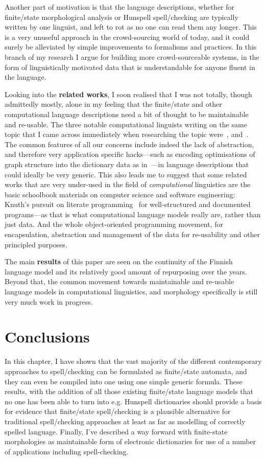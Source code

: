 \documentclass[officiallayout]{unihelcompling}
\begin{document}
Another part of motivation is that the language descriptions, whether for
finite\-/state morphological analysis or Hunspell spell\-/checking are typically
written by one linguist, and left to rot as no one can read them any longer.
This is a very unuseful approach in the crowd-sourcing world of today, and it
could surely be alleviated by simple improvements to formalisms and practices.
In this branch of my research I argue for building more crowd-sourceable
systems, in the form of linguistically motivated data that is understandable
for anyone fluent in the language.

Looking into the \textbf{related works}, I soon realised that I was not
totally, though admittedly mostly, alone in my feeling that the finite\-/state
and other computational language descriptions need a bit of thought to be
maintainable and re-usable. The three notable computational linguists writing
on the same topic that I came across immediately when researching the topic
were~\citet{maxwell2008joint}, and~\citet{wintner2008strengths}. The common
features of all our concerns include indeed the lack of abstraction, and
therefore very application specific hacks---such as encoding optimisations of
graph structure into the dictionary data as in~\citep{karttunen2006numbers}---in language descriptions that could
ideally be very generic. This also leads me to suggest that some related works
that are very under-used in the field of \emph{computational} linguistics are
the basic schoolbook materials on computer science and software engineering:
Knuth's pursuit on literate programming~\citep{knuth1984literate} for
well-structured and documented programs---as that is what computational
language models really are, rather than just data. And the whole
object-oriented programming movement, for encapsulation, abstraction and
management of the data for re-usability and other principled purposes.

The main \textbf{results} of this paper are seen on the continuity of the
Finnish language model and its relatively good amount of repurposing over the
years.  Beyond that, the common movement towards maintainable and re-usable
language models in computational linguistics, and morphology specifically is
still very much work in progress.

\section{Conclusions}

In this chapter, I have shown that the vast majority of the different
contemporary approaches to spell\-/checking can be formulated as finite\-/state
automata, and they can even be compiled into one using one simple generic
formula. These results, with the addition of all those existing finite\-/state
language models that no one has been able to turn into e.g. Hunspell
dictionaries should provide a basis for evidence that finite\-/state
spell\-/checking is a plausible alternative for traditional spell\-/checking
approaches at least as far as modelling of correctly spelled language. Finally,
I've described a way forward with finite-state morphologies as maintainable
form of electronic dictionaries for use of a number of applications including
spell-checking.
\end{document}
